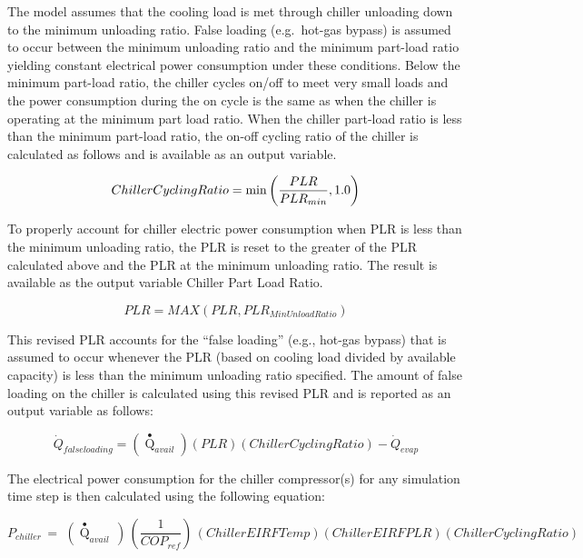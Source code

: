 The model assumes that the cooling load is met through chiller unloading down to the minimum unloading ratio. False loading (e.g.~hot-gas bypass) is assumed to occur between the minimum unloading ratio and the minimum part-load ratio yielding constant electrical power consumption under these conditions. Below the minimum part-load ratio, the chiller cycles on/off to meet very small loads and the power consumption during the on cycle is the same as when the chiller is operating at the minimum part load ratio. When the chiller part-load ratio is less than the minimum part-load ratio, the on-off cycling ratio of the chiller is calculated as follows and is available as an output variable.

\begin{equation}
  ChillerCyclingRatio = \min \left( \frac{PLR}{PLR_{min}}, 1.0 \right)
\end{equation}

To properly account for chiller electric power consumption when PLR is less than the minimum unloading ratio, the PLR is reset to the greater of the PLR calculated above and the PLR at the minimum unloading ratio. The result is available as the output variable Chiller Part Load Ratio.

\begin{equation}
PLR = MAX(PLR,PL{R_{MinUnloadRatio}})
\end{equation}

This revised PLR accounts for the ``false loading'' (e.g., hot-gas bypass) that is assumed to occur whenever the PLR (based on cooling load divided by available capacity) is less than the minimum unloading ratio specified. The amount of false loading on the chiller is calculated using this revised PLR and is reported as an output variable as follows:

\begin{equation}
{\dot{Q}_{falseloading}} = \left( {{{\mathop Q\limits^ \bullet  }_{avail}}} \right)\left( {PLR} \right)\left( {ChillerCyclingRatio} \right) - {\dot{Q}_{evap}}
\end{equation}

The electrical power consumption for the chiller compressor(s) for any simulation time step is then calculated using the following equation:

\begin{equation}
{P_{chiller}}\, = \,\,\left( {{{\mathop Q\limits^ \bullet }_{avail}}\,} \right)\,\left( {\frac{1}{{CO{P_{ref}}}}} \right)\,\left( {ChillerEIRFTemp} \right)\left( {ChillerEIRFPLR} \right)\left( {ChillerCyclingRatio} \right)
\end{equation}

